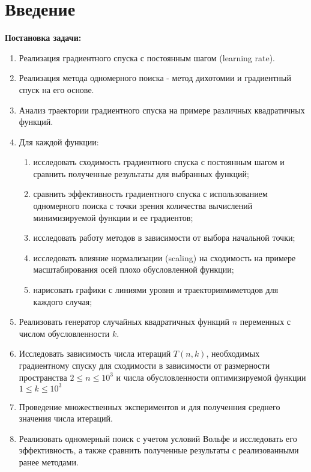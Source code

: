 \chapter*{Введение}
\label{ch:intro}
    \textbf{Постановка задачи:}

    \begin{enumerate}
        \item Реализация градиентного спуска с постоянным шагом (learning rate).
        \item Реализация метода одномерного поиска - метод дихотомии и градиентный спуск на его основе.
        \item Анализ траектории градиентного спуска на примере различных квадратичных
        функций.
        \item Для каждой функции:
        \begin{enumerate}[label=(\alph*)]
            \item исследовать сходимость градиентного спуска с постоянным шагом 
            и сравнить
            полученные результаты для выбранных функций;
            \item сравнить эффективность градиентного спуска с использованием одномерного поиска с точки зрения количества вычислений минимизируемой
            функции и ее градиентов;
            \item
            исследовать работу методов в зависимости от выбора начальной точки;
            \item исследовать влияние нормализации (scaling) на сходимость на примере масштабирования осей плохо обусловленной функции;
            \item нарисовать графики с линиями уровня и траекториямиметодов для каждого случая;
        \end{enumerate}
    
    \item Реализовать генератор случайных квадратичных функций $n$ переменных с числом обусловленности $k$.
    \item
    Исследовать зависимость числа итераций $T(n, k)$, необходимых градиентному
    спуску для сходимости в зависимости от размерности пространства $2 \leq n \leq 10^3$
    и числа обусловленности оптимизируемой функции $1 \leq k \leq 10^3$
    \item Проведение множественных экспериментов и для  полученния среднего  значения числа итераций.
    \item Реализовать одномерный поиск с учетом условий Вольфе и исследовать его эффективность, а также сравнить полученные результаты с реализованными ранее методами.
\end{enumerate}


\endinput